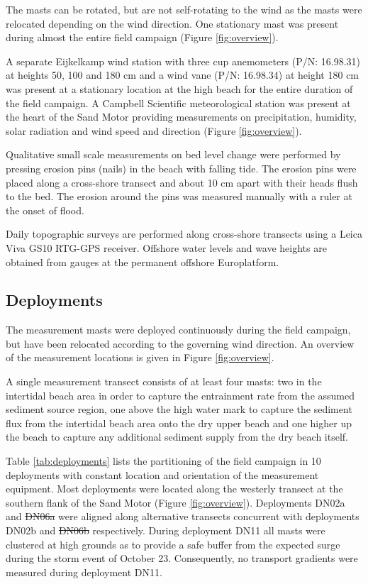 \documentclass[preprint,12pt,authoryear,a4paper]{elsarticle}
\newcommand{\mrq}[2][]{}
\providecommand{\DIFadd}[1]{{\protect\color{blue}\uwave{#1}}} %
\providecommand{\DIFdel}[1]{{\protect\color{red}\sout{#1}}}                      %
\providecommand{\DIFaddbegin}{} %
\providecommand{\DIFaddend}{} %
\providecommand{\DIFdelbegin}{} %
\providecommand{\DIFdelend}{} %
\begin{document}
The masts can be rotated, but are not self-rotating to the wind as the
masts were relocated depending on the wind direction.  One stationary
mast was present during almost the entire field campaign (Figure
\ref{fig:overview}).

A separate Eijkelkamp wind station with three cup anemometers (P/N:
16.98.31) at heights 50, 100 and 180 cm and a wind vane (P/N:
16.98.34) at height 180 cm was present at a stationary location at the
high beach for the entire duration of the field campaign. A Campbell
Scientific meteorological station was present at the heart of the Sand
Motor providing measurements on precipitation, humidity, solar
radiation and wind speed and direction (Figure \ref{fig:overview}).

Qualitative small scale measurements on bed level change were
performed by pressing erosion pins (nails) in the beach with falling
tide. The erosion pins were placed along a cross-shore transect and
about 10 cm apart with their heads flush to the bed. The erosion
around the pins was measured manually with a ruler at the onset of
flood.

Daily topographic surveys are performed along cross-shore transects
using a Leica Viva GS10 RTG-GPS receiver. Offshore water levels and
wave heights are obtained from gauges at the permanent offshore
Europlatform.

\subsection{Deployments}

The measurement masts were deployed continuously during the field
campaign, but have been relocated according to the governing wind
direction. An overview of the measurement locations is given in Figure
\ref{fig:overview}. 

A single measurement transect consists of at least four masts: two in
the intertidal beach area in order to capture the entrainment rate
from the assumed sediment source region, one above the high water mark
to capture the sediment flux from the intertidal beach area onto the
dry upper beach and one higher up the beach to capture any additional
sediment supply from the dry beach itself. \mrq[ss]{1.1} 

Table \ref{tab:deployments} lists the partitioning of the field
campaign in 10 deployments with constant location and orientation of
the measurement equipment. Most deployments were located along the
westerly transect at the southern flank of the Sand Motor (Figure
\ref{fig:overview}). Deployments DN02a and \DIFdelbegin \DIFdel{DN06a }\DIFdelend \DIFaddbegin \DIFadd{DN05a }\DIFaddend were aligned along
alternative transects concurrent with deployments DN02b and \DIFdelbegin \DIFdel{DN06b
}\DIFdelend \DIFaddbegin \DIFadd{DN05b
}\DIFaddend respectively. During deployment DN11 all masts were clustered at high
grounds as to provide a safe buffer from the expected surge during the
storm event of October 23. Consequently, no transport gradients were
measured during deployment DN11.
\end{document}
